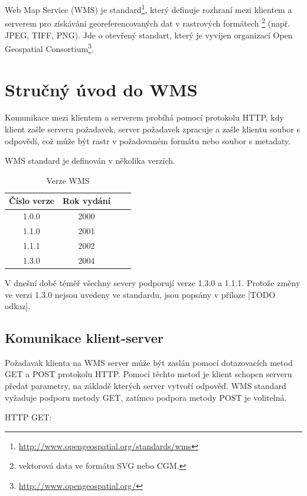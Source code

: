 \documentclass[a4paper,12pt]{article}
\begin{document}
Web Map Service (WMS) je standard\footnote{\url{http://www.opengeospatial.org/standards/wms}}, který definuje rozhraní mezi klientem 
a serverem pro získávání georeferencovaných dat v rastrových formátech \footnote{ vektorová data ve formátu SVG nebo CGM.} (např. JPEG, TIFF, PNG). 
Jde o otevřený standart, který je vyvíjen organizací Open Geospatial Consortium\footnote{\url{http://www.opengeospatial.org/}}.  


\newpage
\section{Stručný úvod do WMS}

Komunikace mezi klientem a serverem probíhá pomocí protokolu HTTP, kdy klient zašle serveru požadavek, 
server požadavek zpracuje a  zašle klientu soubor s odpovědí, což může být rastr v požadovaném formátu nebo soubor s metadaty.

WMS standard je definován v několika verzích.

\begin{table}[h]
\centering
\begin{tabular}{|c|c|c|c|}      \hline
  Číslo verze  & Rok vydání  \\ \hline
  1.0.0        &  2000       \\ \hline
  1.1.0        &  2001       \\ \hline
  1.1.1        &  2002       \\ \hline
  1.3.0        &  2004       \\ \hline
\end{tabular}
\caption{Verze WMS}
\label{tab:verze}
\end{table}

V dnešní době téměř všechny severy podporují verze 1.3.0 a 1.1.1. Protože
změny ve verzi 1.3.0 nejsou uvedeny ve standardu, jsou popsány v příloze [TODO odkaz].


\subsection{Komunikace klient-server}


Požadavak klienta na WMS server může být zaslán pomocí dotazovacích metod GET a POST protokolu HTTP. Pomocí těchto metod je klient schopen
serveru předat parametry, na základě kterých server vytvoří odpověď. WMS standard vyžaduje podporu metody GET, zatímco podpora metody POST je volitelná. 

HTTP GET:
\end{document}
